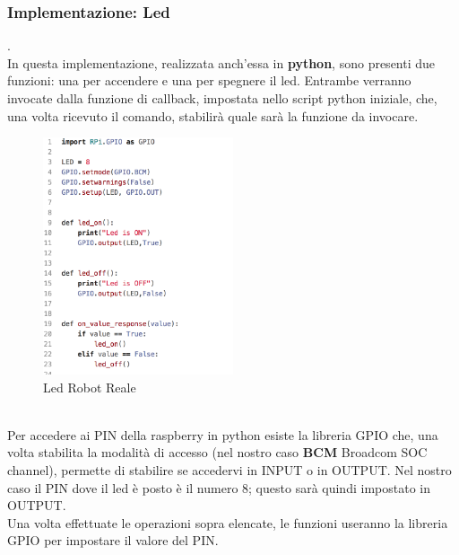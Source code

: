 \documentclass{llncs}
\begin{document}
\subsubsection{Implementazione: Led} .
\label{ImplementazioneReq4Led}
\vspace*{1ex}
\\
In questa implementazione, realizzata anch'essa in \textbf{python}, sono presenti due funzioni: una per accendere e una per spegnere il led. Entrambe verranno invocate dalla funzione di callback, impostata nello script python iniziale, che, una volta ricevuto il comando, stabilir\`a quale sar\`a la funzione da invocare.\\
\begin{figure}
    \centering
    \includegraphics[width=0.5\textwidth]{Immagini/Requisito4/LedGPIOReq4.png}
    \caption{Led Robot Reale}
    \label{fig:LRR}
\end{figure}
\vspace*{1ex}
\\
Per accedere ai PIN della raspberry in python esiste la libreria GPIO che, una volta stabilita la modalit\`a di accesso (nel nostro caso \textbf{BCM} Broadcom SOC channel), permette di stabilire se accedervi in INPUT o in OUTPUT. Nel nostro caso il PIN dove il led \`e posto \`e il numero 8; questo sar\`a quindi impostato in OUTPUT.\\
Una volta effettuate le operazioni sopra elencate, le funzioni useranno la libreria GPIO per impostare il valore del PIN.

\end{document}

